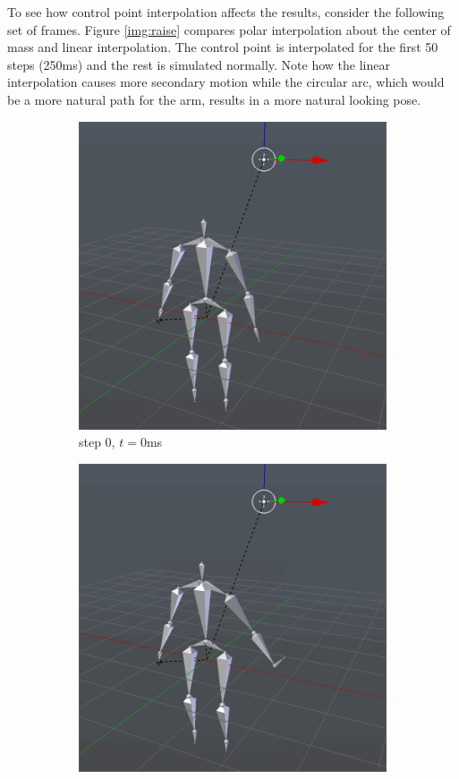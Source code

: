 \documentclass[10pt,twocolumn,letterpaper]{article}
\begin{document}
To see how control point interpolation affects the results, consider the following set of frames. Figure \ref{img:raise} compares polar interpolation about the center of mass and linear interpolation. The control point is interpolated for the first 50 steps (250ms) and the rest is simulated normally. Note how the linear interpolation causes more secondary motion while the circular arc, which would be a more natural path for the arm, results in a more natural looking pose.

\begin{figure}[h]
    \centering
    \begin{subfigure}{0.2\textwidth}
        \centering
        \includegraphics[width=.9\linewidth]{raise-circ-0.png}
        \caption{step 0, $t=0$ms}
    \end{subfigure}\begin{subfigure}{0.2\textwidth}
        \centering
        \includegraphics[width=.9\linewidth]{raise-circ-1.png}

\end{subfigure}
\end{figure}
\end{document}
